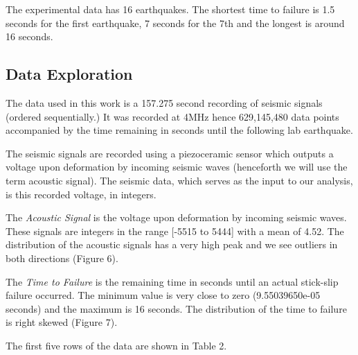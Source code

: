 \documentclass[]{llncs} %
\begin{document}
The experimental data has 16 earthquakes. The shortest time to failure is 1.5 seconds for the first earthquake, 7 seconds for the 7th and the longest is around 16 seconds. \par

\subsection{Data Exploration}
The data used in this work is a 157.275 second recording of seismic signals (ordered sequentially.) It was recorded at 4MHz hence 629,145,480 data points accompanied by the time remaining in seconds until the following lab earthquake. \par
The seismic signals are recorded using a piezoceramic sensor which outputs a voltage upon deformation by incoming seismic waves (henceforth we will use the term acoustic signal). The seismic data, which serves as the input to our analysis, is this recorded voltage, in integers. \par
The \emph{Acoustic Signal} is the voltage upon deformation by incoming seismic waves. These signals are integers in the range [-5515 to 5444] with a mean of 4.52. The distribution of the acoustic signals has a very high peak and we see outliers in both directions (Figure 6). \par
The \emph{Time to Failure} is the remaining time in seconds until an actual stick-slip failure occurred. The minimum value is very close to zero (9.55039650e-05 seconds) and the maximum is 16 seconds. The distribution of the time to failure is right skewed (Figure 7). \par
The first five rows of the data are shown in Table 2. \par
\end{document}
